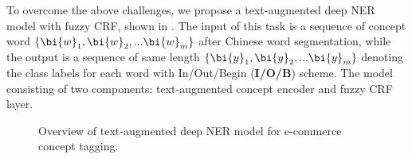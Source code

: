 To overcome the above challenges,
we propose a text-augmented deep NER model with fuzzy CRF,
shown in .
The input of this task is a sequence of concept word $\{\bi{w}_1, \bi{w}_2,...\bi{w}_m\}$ after Chinese word segmentation, 
while the output is a sequence of same length $\{\bi{y}_1, \bi{y}_2,...\bi{y}_m\}$ denoting the class labels for each word with In/Out/Begin (\textbf{I/O/B}) scheme.
The model consisting of two components: text-augmented concept encoder and fuzzy CRF layer.

\begin{figure}[th]
	\centering
	\caption{Overview of text-augmented deep NER model for e-commerce concept tagging.
	}
	\label{fig:tagging}
\end{figure}


